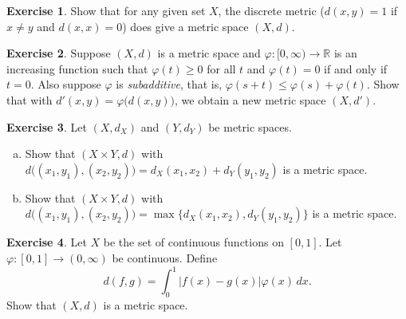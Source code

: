 \documentclass[12pt,openany]{book}
\newcommand{\babs}[1]{\bigl\lvert {#1} \bigr\rvert}
\newcommand{\R}{{\mathbb{R}}}
\newcommand{\myindex}[1]{#1\index{#1}}
\theoremstyle{plain}
\theoremstyle{remark}
\theoremstyle{definition}
\newenvironment{exbox}{%
    \def\FrameCommand{\vrule width 1pt \relax\hspace{10pt}}%
    \MakeFramed{\advance\hsize-\width\FrameRestore}%
}{%
    \endMakeFramed
}
\newenvironment{exparts}{%
    \leavevmode\begin{enumerate}[a),noitemsep,topsep=0pt,parsep=0pt,partopsep=0pt]
}{%
    \end{enumerate}
}
\theoremstyle{exercise}
\newtheorem{exercise}{Exercise}[section]
\theoremstyle{example}
\begin{document}
\begin{exbox}
\begin{exercise}
Show that for any given set $X$, the discrete metric ($d(x,y) = 1$ if $x\not=y$ and
$d(x,x) = 0$) does give a metric space $(X,d)$.
\end{exercise}

\begin{exercise}
Suppose $(X,d)$ is a metric space and
$\varphi \colon [0,\infty) \to \R$ is
an increasing function such that 
$\varphi(t) \geq 0$ for all $t$ and $\varphi(t) = 0$ if and only if
$t=0$.  Also suppose $\varphi$ is \emph{\myindex{subadditive}},
that is, $\varphi(s+t) \leq \varphi(s)+\varphi(t)$.
Show that with $d'(x,y) = \varphi\bigl(d(x,y)\bigr)$, we obtain a new
metric space $(X,d')$.
\end{exercise}

\begin{exercise} \label{exercise:mscross}
Let $(X,d_X)$ and $(Y,d_Y)$ be metric spaces.
\begin{exparts}
\item
Show that $(X \times Y,d)$ with
$d\bigl( (x_1,y_1), (x_2,y_2) \bigr) = d_X(x_1,x_2) + d_Y(y_1,y_2)$ is
a metric space.
\item
Show that $(X \times Y,d)$ with
$d\bigl( (x_1,y_1), (x_2,y_2) \bigr) = \max \{ d_X(x_1,x_2) , d_Y(y_1,y_2) \}$ is
a metric space.
\end{exparts}
\end{exercise}

\begin{exercise}
Let $X$ be the set of continuous functions on $[0,1]$.  Let $\varphi \colon
[0,1] \to (0,\infty)$ be continuous.  Define
\begin{equation*}
d(f,g) = \int_0^1 \babs{f(x)-g(x)}\varphi(x)\,dx .
\end{equation*}
Show that $(X,d)$ is a metric space.
\end{exercise}


\end{exbox}
\end{document}
